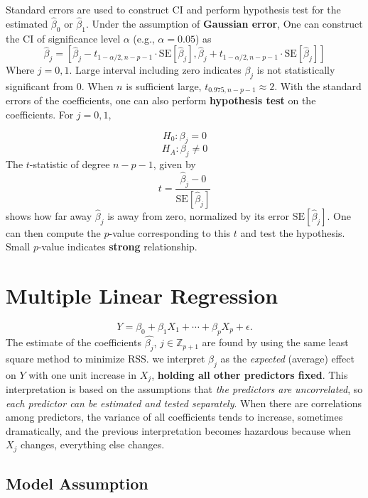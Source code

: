 \documentclass[
  letterpaper,
  DIV=11,
  numbers=noendperiod]{scrreprt}
\begin{document}
Standard errors are used to construct CI and perform hypothesis test for
the estimated \(\hat{\beta}_0\) or \(\hat{\beta}_1\). Under the
assumption of \textbf{Gaussian error}, One can construct the CI of
significance level \(\alpha\) (e.g., \(\alpha=0.05\)) as \[
\hat{\beta}_j = [\hat{\beta}_j- t_{1-\alpha/2,n-p-1}\cdot \text{SE}[\hat{\beta}_j], \hat{\beta}_j+ t_{1-\alpha/2,n-p-1} \cdot \text{SE}[\hat{\beta}_j]  ]
\] Where \(j=0, 1\). Large interval including zero indicates \(\beta_j\)
is not statistically significant from 0. When \(n\) is sufficient large,
\(t_{0.975,n-p-1} \approx 2\). With the standard errors of the
coefficients, one can also perform \textbf{hypothesis test} on the
coefficients. For \(j=0,1\),

\[H_0: \beta_j=0\] \[H_A: \beta_j\ne 0\] The \(t\)-statistic of degree
\(n-p-1\), given by \[
t = \frac{\hat{\beta}_j - 0}{\text{SE}[\hat{\beta}_j]}
\] shows how far away \(\hat{\beta}_j\) is away from zero, normalized by
its error \(\text{SE}[\hat{\beta}_j]\). One can then compute the
\(p\)-value corresponding to this \(t\) and test the hypothesis. Small
\(p\)-value indicates \textbf{strong} relationship.

\section{Multiple Linear Regression}\label{multiple-linear-regression}

\[
Y= \beta_0 + \beta_1X_1 +\cdots + \beta_pX_p + \epsilon.
\] The estimate of the coefficients \(\hat{\beta_j}\),
\(j\in \mathbb{Z}_{p+1}\) are found by using the same least square
method to minimize RSS. we interpret \(\beta_j\) as the \emph{expected}
(average) effect on \(Y\) with one unit increase in \(X_j\),
\textbf{holding all other predictors fixed}. This interpretation is
based on the assumptions that \emph{the predictors are uncorrelated}, so
\emph{each predictor can be estimated and tested separately}. When there
are correlations among predictors, the variance of all coefficients
tends to increase, sometimes dramatically, and the previous
interpretation becomes hazardous because when \(X_j\) changes,
everything else changes.

\subsection{\texorpdfstring{\textbf{Model
Assumption}}{Model Assumption}}\label{model-assumption}
\end{document}
